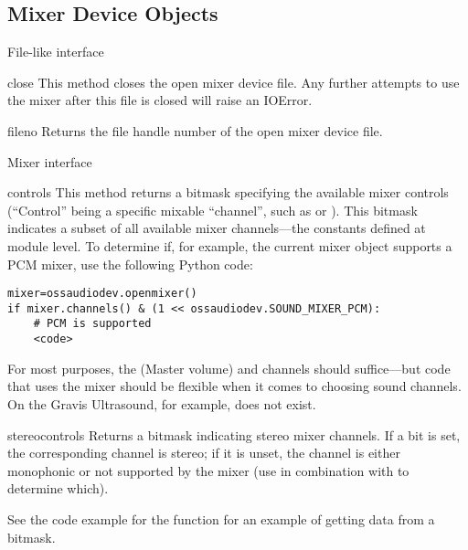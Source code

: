 \subsection{Mixer Device Objects \label{mixer-device-objects}}

File-like interface

\begin{methoddesc}{close}{}
This method closes the open mixer device file.  Any further attempts to
use the mixer after this file is closed will raise an IOError.
\end{methoddesc}

\begin{methoddesc}{fileno}{}
Returns the file handle number of the open mixer device file.
\end{methoddesc}

Mixer interface

\begin{methoddesc}{controls}{}
This method returns a bitmask specifying the available mixer controls
(``Control'' being a specific mixable ``channel'', such as
 or ).  This
bitmask indicates a subset of all available mixer channels---the
 constants defined at module level.  To determine if,
for example, the current mixer object supports a PCM mixer, use the
following Python code:

\begin{verbatim}
mixer=ossaudiodev.openmixer()
if mixer.channels() & (1 << ossaudiodev.SOUND_MIXER_PCM):
	# PCM is supported
	<code>
\end{verbatim}

For most purposes, the  (Master volume) and
 channels should suffice---but code that uses the
mixer should be flexible when it comes to choosing sound channels.  On
the Gravis Ultrasound, for example,  does not
exist.
\end{methoddesc}

\begin{methoddesc}{stereocontrols}{}
Returns a bitmask indicating stereo mixer channels.  If a bit is set,
the corresponding channel is stereo; if it is unset, the channel is
either monophonic or not supported by the mixer (use in combination with
 to determine which).

See the code example for the  function for an example
of getting data from a bitmask.
\end{methoddesc}

